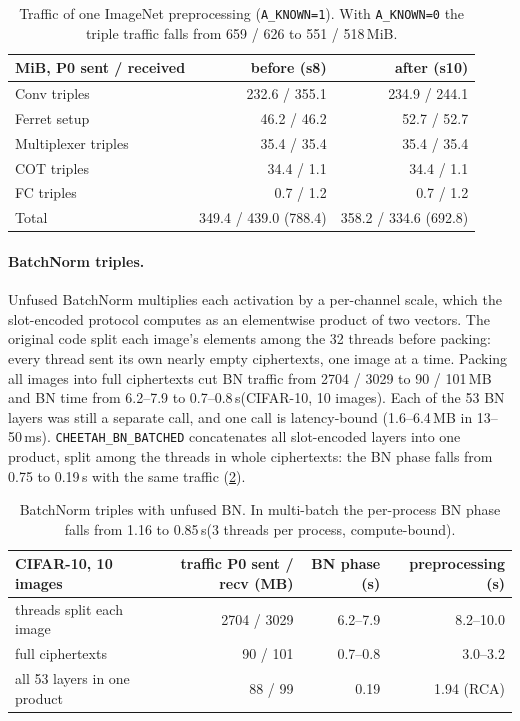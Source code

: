 \documentclass[10pt,a4paper]{article}
\newcommand{\flag}[1]{\nolinkurl{#1}}
\newcommand{\ms}{\,ms\xspace}
\newcommand{\s}{\,s\xspace}
\begin{document}
\begin{table}[t]
\centering\small
\begin{tabular}{@{}lrr@{}}
\toprule
MiB, P0 sent / received & before (s8) & after (s10)\\
\midrule
Conv triples & 232.6 / 355.1 & 234.9 / 244.1\\
Ferret setup & 46.2 / 46.2 & 52.7 / 52.7\\
Multiplexer triples & 35.4 / 35.4 & 35.4 / 35.4\\
COT triples & 34.4 / 1.1 & 34.4 / 1.1\\
FC triples & 0.7 / 1.2 & 0.7 / 1.2\\
\midrule
Total & 349.4 / 439.0 (788.4) & 358.2 / 334.6 (692.8)\\
\bottomrule
\end{tabular}
\caption{Traffic of one ImageNet preprocessing (\flag{A_KNOWN=1}). With \flag{A_KNOWN=0} the triple
traffic falls from 659 / 626 to 551 / 518\,MiB.}
\label{tab:traffic}
\end{table}

\paragraph{BatchNorm triples.} Unfused BatchNorm multiplies each activation by a per-channel scale, which
the slot-encoded protocol computes as an elementwise product of two vectors. The original code split each image's
elements among the 32 threads before packing: every thread sent its own nearly empty ciphertexts, one image at
a time. Packing all images into full ciphertexts cut BN traffic from 2704 / 3029 to 90 / 101\,MB and BN time from
6.2--7.9 to 0.7--0.8\s (CIFAR-10, 10 images). Each of the 53 BN layers was still a separate call, and one
call is latency-bound (1.6--6.4\,MB in 13--50\ms). \flag{CHEETAH_BN_BATCHED} concatenates all slot-encoded
layers into one product, split among the threads in whole ciphertexts: the BN phase falls from 0.75 to
0.19\s with the same traffic (\cref{tab:bn}).

\begin{table}[t]
\centering\small
\begin{tabular}{@{}lrrr@{}}
\toprule
CIFAR-10, 10 images & traffic P0 sent / recv (MB) & BN phase (s) & preprocessing (s)\\
\midrule
threads split each image & 2704 / 3029 & 6.2--7.9 & 8.2--10.0\\
full ciphertexts & 90 / 101 & 0.7--0.8 & 3.0--3.2\\
all 53 layers in one product & 88 / 99 & 0.19 & 1.94 (RCA)\\
\bottomrule
\end{tabular}
\caption{BatchNorm triples with unfused BN. In multi-batch the per-process BN phase falls from 1.16 to
0.85\s (3 threads per process, compute-bound).}
\label{tab:bn}
\end{table}
\end{document}

